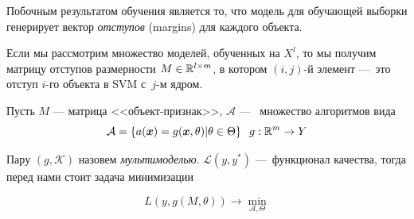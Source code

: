 \documentclass[12pt,twoside]{article}
\renewcommand{\L}{\mathcal{L}}
\begin{document}
Побочным результатом обучения является то, что модель для обучающей выборки генерирует вектор \emph{отступов} (margins) для каждого объекта.

Если мы рассмотрим множество моделей, обученных на $X^l$, то мы получим матрицу отступов  размерности
$M \in \R^{l\times m}$,
в котором $(i, j)$-й элемент ---~это отступ $i$-го объекта в SVM с~$j$-м ядром.

Пусть $M$ --- матрица <<объект-признак>>, $\mathcal{A}$ ---~ множество алгоритмов
вида
\begin{equation}
    \mathcal{A} = \left\{a(\boldsymbol{x}) = g(\boldsymbol{x}, \theta)|\theta \in \Theta\right\}\;\; g:\mathbb{R}^m \to Y
\end{equation}

Пару $(g, \mathcal{K})$ назовем \emph{мультимоделью}.
$\L(y, y^*)$ ---~функционал качества, тогда перед нами стоит задача минимизации

\begin{equation}
    L(y, g(M, \theta)) \to \min_{\mathcal{A}, \Theta}
\end{equation}

%
%
%
%
%
%
%
%
%
%
\end{document}
